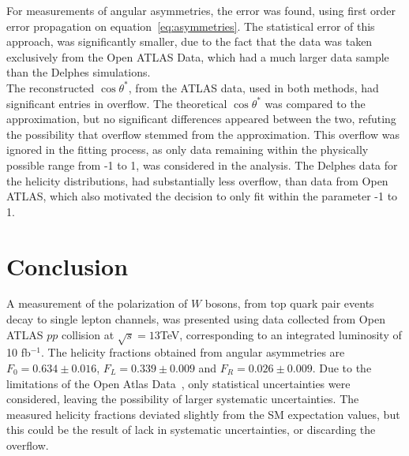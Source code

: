 \documentclass[12pt,a4paper]{article}
\numberwithin{equation}{section}
\begin{document}

For measurements of angular asymmetries, the error was found, using first order
error propagation on equation~\eqref{eq:asymmetries}. The statistical error of
this approach, was significantly smaller, due to the fact that the data was
taken exclusively from the Open ATLAS Data, which had a much larger data sample
than the Delphes simulations.\\

The reconstructed $\cos \theta^*$, from the ATLAS data, used in both methods, had
significant entries in overflow. The theoretical $\cos \theta^*$ was compared to the
approximation, but no significant differences appeared between the two, refuting
the possibility that overflow stemmed from the approximation.
This %
overflow was ignored in the fitting process, as only data remaining within the
physically possible range from -1 to 1, was considered in the analysis. The
Delphes data for the helicity distributions, had substantially less overflow,
than data from Open ATLAS, which also motivated the decision to only fit within
the parameter -1 to 1.


\section{Conclusion}
A measurement of the polarization of $W$ bosons, from top quark pair events
decay to single lepton channels, was presented using data collected from Open
ATLAS $pp$ collision at $\sqrt s = 13$TeV, corresponding to an integrated
luminosity of 10 fb$^{-1}$. The helicity fractions obtained from angular
asymmetries are $F_0=0.634 \pm 0.016$, $F_L=0.339 \pm 0.009$ and
$F_R=0.026 \pm 0.009$. Due to the limitations of the Open Atlas
Data~\cite{oreach2020}, only statistical uncertainties were considered, leaving
the possibility of larger systematic uncertainties. The measured helicity
fractions deviated slightly from the SM expectation values, but this could be
the result of lack in systematic uncertainties, or discarding the overflow.


\printbibliography
\end{document}
